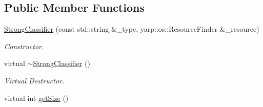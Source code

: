 \subsection*{Public Member Functions}
\begin{DoxyCompactItemize}
\item 
\hyperlink{classiCub_1_1boostMIL_1_1StrongClassifier_a407c69ef59d13318ea82454e564002f9}{Strong\+Classifier} (const std\+::string \&\+\_\+type, yarp\+::os\+::\+Resource\+Finder \&\+\_\+resource)
\begin{DoxyCompactList}\small\item\em Constructor. \end{DoxyCompactList}\item 
virtual \hyperlink{classiCub_1_1boostMIL_1_1StrongClassifier_a8ba84a361db71eef607f56c023df00d3}{$\sim$\+Strong\+Classifier} ()\label{classiCub_1_1boostMIL_1_1StrongClassifier_a8ba84a361db71eef607f56c023df00d3}

\begin{DoxyCompactList}\small\item\em Virtual Destructor. \end{DoxyCompactList}\item 
virtual int \hyperlink{classiCub_1_1boostMIL_1_1StrongClassifier_a99285415c37a3f1271c8afb2b5e3ae94}{get\+Size} ()\label{classiCub_1_1boostMIL_1_1StrongClassifier_a99285415c37a3f1271c8afb2b5e3ae94}


\end{DoxyCompactItemize}
